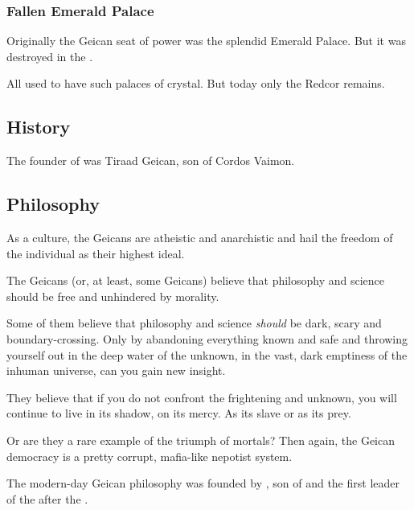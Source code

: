 \subsubsection{Fallen Emerald Palace}
Originally the Geican seat of power was the splendid Emerald Palace. 
But it was destroyed in the \darkfall. 

All \VaimonClans used to have such palaces of crystal. 
But today only the Redcor  remains. 








\subsection{History}
The founder of \ClanGeican was Tiraad Geican, son of Cordos Vaimon. 









\subsection{Philosophy}
As a culture, the Geicans are atheistic and anarchistic and hail the freedom of the individual as their highest ideal. 

The Geicans (or, at least, some Geicans) believe that philosophy and science should be free and unhindered by morality. 

Some of them believe that philosophy and science \emph{should} be dark, scary and boundary-crossing. Only by abandoning everything known and safe and throwing yourself out in the deep water of the unknown, in the vast, dark emptiness of the inhuman universe, can you gain new insight. 

They believe that if you do not confront the frightening and unknown, you will continue to live in its shadow, on its mercy. As its slave or as its prey. 

Or are they a rare example of the triumph of mortals? Then again, the Geican democracy is a pretty corrupt, mafia-like nepotist system.

The modern-day Geican philosophy was founded by , son of  \Belzir{} and the first leader of the \vclan after the \Darkfall. 






